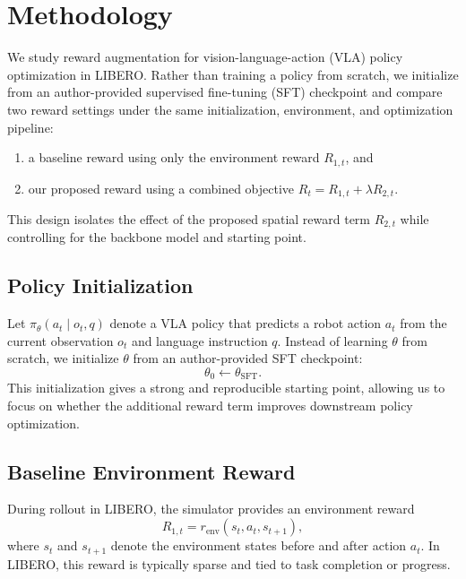 \section{Methodology}
\label{sec:method}

We study reward augmentation for vision-language-action (VLA) policy optimization in LIBERO.
Rather than training a policy from scratch, we initialize from an author-provided supervised fine-tuning (SFT) checkpoint and compare two reward settings under the same initialization, environment, and optimization pipeline:
\begin{enumerate}
    \item a baseline reward using only the environment reward $R_{1,t}$, and
    \item our proposed reward using a combined objective $R_t = R_{1,t} + \lambda R_{2,t}$.
\end{enumerate}
This design isolates the effect of the proposed spatial reward term $R_{2,t}$ while controlling for the backbone model and starting point.

\subsection{Policy Initialization}

Let $\pi_\theta(a_t \mid o_t, q)$ denote a VLA policy that predicts a robot action $a_t$ from the current observation $o_t$ and language instruction $q$.
Instead of learning $\theta$ from scratch, we initialize $\theta$ from an author-provided SFT checkpoint:
\begin{equation}
    \theta_0 \leftarrow \theta_{\text{SFT}}.
\end{equation}
This initialization gives a strong and reproducible starting point, allowing us to focus on whether the additional reward term improves downstream policy optimization.

\subsection{Baseline Environment Reward}

During rollout in LIBERO, the simulator provides an environment reward
\begin{equation}
    R_{1,t} = r_{\text{env}}(s_t, a_t, s_{t+1}),
\end{equation}
where $s_t$ and $s_{t+1}$ denote the environment states before and after action $a_t$.
In LIBERO, this reward is typically sparse and tied to task completion or progress.

